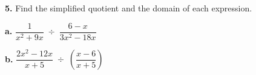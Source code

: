 \documentclass[11pt]{article}
\newcommand{\workspace}[1]{\vspace{#1}}
\begin{document}
\begin{tryit}
\textbf{5.} Find the simplified quotient and the domain of each expression.

\vspace{0.3em}
\begin{minipage}[t]{0.48\textwidth}
\textbf{a.} $\dfrac{1}{x^{2}+9x}\;\div\;\dfrac{6-x}{3x^{2}-18x}$
\workspace{3.8cm}
\end{minipage}\hfill
\begin{minipage}[t]{0.48\textwidth}
\textbf{b.} $\dfrac{2x^{2}-12x}{x+5}\;\div\;\left(\dfrac{x-6}{x+5}\right)$
\workspace{3.8cm}
\end{minipage}
\end{tryit}

\newpage

\end{document}
